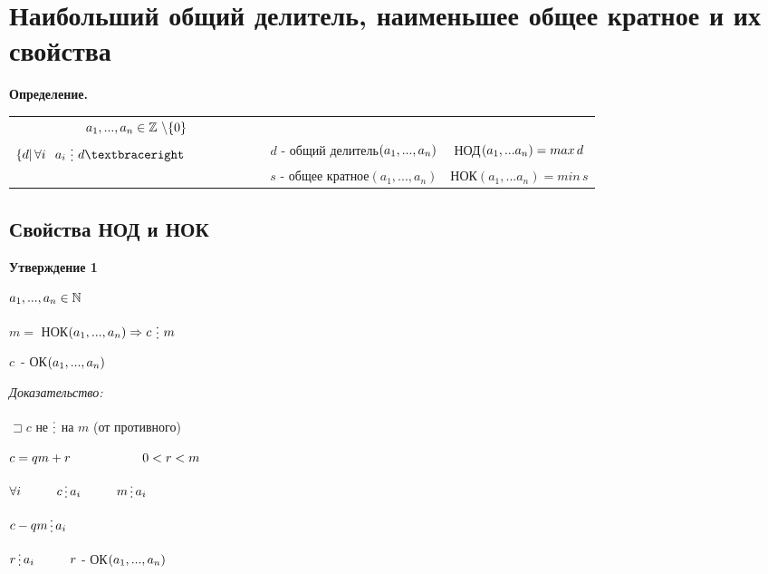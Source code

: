 \documentclass[12pt]{article}
\begin{document}
\section{Наибольший общий делитель, наименьшее общее кратное и их свойства}
\textbf{Определение.}\par
\begin{tabular}{ccc}
$a_1,...,a_n \in \mathbb{Z} \, \, \backslash \{0\} \vspace{2 ex}$ \\
$\{ d| \, \forall i \, \hspace{2 mm} a_i \, \mathop{\raisebox{-2pt}{\vdots}} \, d\textbraceright \hspace{2 cm}$ & $d$ - общий делитель$(a_1,...,a_n) \vspace{2 ex}$ & НОД$(a_1,...a_n) = max \, d \vspace{2 ex}$ \\
& $s$ - общее кратное$(a_1,...,a_n)$ & НОК$(a_1,...a_n) = min \, s $ \\
\end{tabular}\par

\subsection{Свойства НОД и НОК}
    \textbf{Утверждение 1}\par
    $a_1,...,a_n \in \mathbb{N} \vspace{1 ex}$\par
    $m =$ НОК$(a_1,...,a_n) \Rightarrow c\, \mathop{\raisebox{-2pt}{\vdots}} \,m$\par
    $c \,$ - ОК$(a_1,...,a_n) \newline$\par
    \textit{Доказательство:}\par
    $\sqsupset c$ не $\mathop{\raisebox{-2pt}{\vdots}}$ на $m$ (от противного)\par
    $c = qm+r \hspace{2 cm} 0 < r < m$\par
    $\forall i \hspace{1 cm} c \mathop{\raisebox{-2pt}{\vdots}} a_i \hspace{1 cm} m \mathop{\raisebox{-2pt}{\vdots}} a_i$\par
    $c-qm \mathop{\raisebox{-2pt}{\vdots}} a_i$\par
    $r \mathop{\raisebox{-2pt}{\vdots}} a_i \hspace{1 cm} r$ - ОК$(a_1,...,a_n) \newline$\par
    
\end{document}

